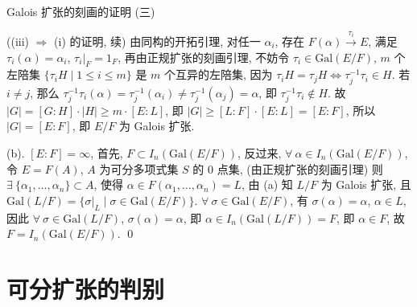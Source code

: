 \begin{frame}{Galois 扩张的刻画的证明 (三)}

\startproof[bg=yellow, fg=red]((iii) $\Longrightarrow$ (i) 的证明, 续)
由同构的开拓引理, 对任一 $\alpha_i$, 存在 $F(\alpha) \xrightarrow{\ \tau_i\ } E$,
满足 $\tau_i(\alpha) = \alpha_i$, $\tau_i|_F = 1_F$,
再由正规扩张的刻画引理, 不妨令 $\tau_i \in \mathrm{Gal}(E/F)$,
$m$ 个左陪集 $\{ \tau_i H \mid 1 \leq i \leq m \}$
是 $m$ 个互异的左陪集, 因为 $\tau_i H = \tau_j H \iff \tau_j^{-1} \tau_i \in H$.
若 $i \neq j$, 那么 $\tau_j^{-1} \tau_i(\alpha) = \tau_j^{-1}(\alpha_i)
\neq \tau_j^{-1}(\alpha_j) = \alpha$, 即 $\tau_j^{-1} \tau_i \notin H$.
故 $|G| = [G:H] \cdot |H| \geq m \cdot [E:L]$,
即 $|G| \geq [L:F] \cdot [E:L] = [E:F]$, 所以 $|G| = [E:F]$, 即 $E/F$ 为 Galois 扩张.

\pause

(b). $[E:F] = \infty$,
首先, $F \subset I_n(\mathrm{Gal}(E/F))$,
反过来, $\forall\ \alpha \in I_n(\mathrm{Gal}(E/F))$, 令 $E = F(A)$,
$A$ 为可分多项式集 $S$ 的 0 点集,
(由正规扩张的刻画引理) 则 $\exists\ \{ \alpha_1, \dots, \alpha_n \} \subset A$,
使得 $\alpha \in F(\alpha_1, \dots, \alpha_n) = L$,
由 (a) 知 $L/F$ 为 Galois 扩张, 且
$\mathrm{Gal}(L/F) = \{ \sigma|_L \mid \sigma \in \mathrm{Gal}(E/F) \}$.
$\forall\ \sigma \in \mathrm{Gal}(E/F)$, 有 $\sigma(\alpha) = \alpha$, $\alpha \in L$,
因此 $\forall\ \sigma \in \mathrm{Gal}(L/F)$, $\sigma(\alpha) = \alpha$,
即 $\alpha \in I_n(\mathrm{Gal}(L/F)) = F$,
即 $\alpha \in F$, 故 $F = I_n(\mathrm{Gal}(E/F))$.
\qed

\end{frame}


\section[判别]{可分扩张的判别}


